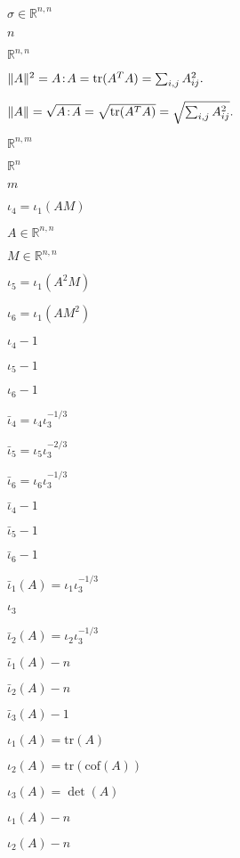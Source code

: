 \documentclass{article}
\begin{document}
$\sigma\in\mathbb{R}^{n,n}$
\pagebreak

$n$
\pagebreak

$\mathbb{R}^{n,n}$
\pagebreak

$ \|A\|^2 = A\negthinspace : \negthinspace A = \mathrm{tr}(A^TA) = \sum_{i,j} A_{ij}^2. $
\pagebreak

$ \|A\| = \sqrt{A\negthinspace : \negthinspace A }= \sqrt{\mathrm{tr}(A^TA)} = \sqrt{\sum_{i,j} A_{ij}^2}. $
\pagebreak

$\mathbb{R}^{n,m}$
\pagebreak

$\mathbb{R}^n$
\pagebreak

$m$
\pagebreak

$ \iota_4=\iota_1(AM) $
\pagebreak

$A\in\mathbb{R}^{n,n}$
\pagebreak

$M\in\mathbb{R}^{n,n}$
\pagebreak

$ \iota_5=\iota_1(A^2M) $
\pagebreak

$ \iota_6=\iota_1(AM^2) $
\pagebreak

$ \iota_4 - 1 $
\pagebreak

$ \iota_5 - 1 $
\pagebreak

$ \iota_6 - 1 $
\pagebreak

$\bar\iota_4=\iota_4\iota_3^{-1/3}$
\pagebreak

$\bar\iota_5=\iota_5\iota_3^{-2/3}$
\pagebreak

$\bar\iota_6=\iota_6\iota_3^{-1/3}$
\pagebreak

$ \bar\iota_4 - 1 $
\pagebreak

$ \bar\iota_5 - 1 $
\pagebreak

$ \bar\iota_6 - 1 $
\pagebreak

$ \bar\iota_1(A)=\iota_1\iota_3^{-1/3} $
\pagebreak

$\iota_3$
\pagebreak

$ \bar\iota_2(A)=\iota_2\iota_3^{-1/3} $
\pagebreak

$ \bar\iota_1(A) - n $
\pagebreak

$ \bar\iota_2(A) - n $
\pagebreak

$ \bar\iota_3(A) - 1 $
\pagebreak

$ \iota_1(A)=\mathrm{tr}(A) $
\pagebreak

$ \iota_2(A)=\mathrm{tr}(\mathrm{cof}(A)) $
\pagebreak

$ \iota_3(A)=\det(A) $
\pagebreak

$ \iota_1(A) - n $
\pagebreak

$ \iota_2(A) - n $
\pagebreak
\end{document}
